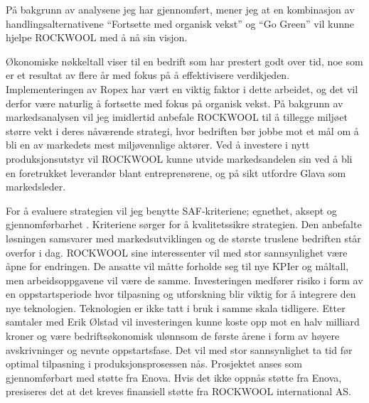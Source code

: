På bakgrunn av analysene jeg har gjennomført, mener jeg at en kombinasjon av handlingsalternativene “Fortsette med organisk vekst” og “Go Green” vil kunne hjelpe ROCKWOOL med å nå sin visjon.

\indent \newline
Økonomiske nøkkeltall viser til en bedrift som har prestert godt over tid, noe som er et resultat av flere år med fokus på å effektivisere verdikjeden. Implementeringen av Ropex har vært en viktig faktor i dette arbeidet, og det vil derfor være naturlig å fortsette med fokus på organisk vekst. På bakgrunn av markedsanalysen vil jeg imidlertid anbefale ROCKWOOL til å tillegge miljøet større vekt i deres nåværende strategi, hvor bedriften bør jobbe mot et mål om å bli en av markedets mest miljøvennlige aktører. Ved å investere i nytt produksjonsutstyr vil ROCKWOOL kunne utvide markedsandelen sin ved å bli en foretrukket leverandør blant entreprenørene, og på sikt utfordre Glava som markedsleder.

\indent \newline
For å evaluere strategien vil jeg benytte SAF-kriteriene; egnethet, aksept og gjennomførbarhet \cite[s.~236-241]{FundamentalsOfStrategy}. Kriteriene sørger for å kvalitetssikre strategien. Den anbefalte løsningen samsvarer med markedsutviklingen og de største truslene bedriften står overfor i dag. ROCKWOOL sine interessenter vil med stor sannsynlighet være åpne for endringen. De ansatte vil måtte forholde seg til nye KPIer og måltall, men arbeidsoppgavene vil være de samme. Investeringen medfører risiko i form av en oppstartsperiode hvor tilpasning og utforskning blir viktig for å integrere den nye teknologien. Teknologien er ikke tatt i bruk i samme skala tidligere. Etter samtaler med Erik Ølstad vil investeringen kunne koste opp mot en halv milliard kroner og være bedriftsøkonomisk ulønnsom de første årene i form av høyere avskrivninger og nevnte oppstartsfase. Det vil med stor sannsynlighet ta tid før optimal tilpasning i produksjonsprosessen nås. Prosjektet anses som gjennomførbart med støtte fra Enova. Hvis det ikke oppnås støtte fra Enova, presiseres det at det kreves finansiell støtte fra ROCKWOOL international AS.